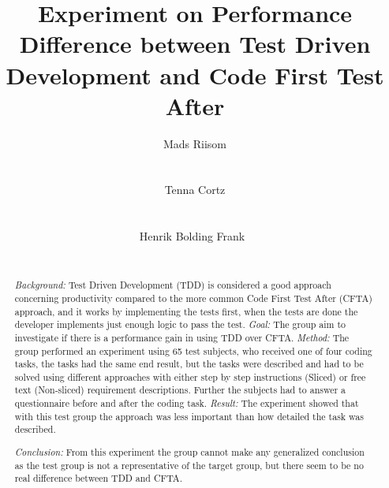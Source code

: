 \documentclass{sig-alternate-05-2015}
\begin{document}
	




\title{Experiment on Performance Difference between Test Driven Development and Code First Test After}

\author{
\alignauthor
	Mads Riisom\\
	\\
	\\
\alignauthor
	Tenna Cortz\\
	\\
	\\
\alignauthor
	Henrik Bolding Frank\
	\\
	\\
}

\maketitle
\begin{abstract}
\textit{Background:} Test Driven Development (TDD) is considered a good approach concerning productivity compared to the more common Code First Test After (CFTA) approach, and it works by implementing the tests first, when the tests are done the developer implements just enough logic to pass the test. \textit{Goal:} The group aim to investigate if there is a performance gain in using TDD over CFTA. \textit{Method:} The group performed an experiment using 65 test subjects, who received one of four coding tasks, the tasks had the same end result, but the tasks were described and had to be solved using different approaches with either step by step instructions (Sliced) or free text (Non-sliced) requirement descriptions. Further the subjects had to answer a questionnaire before and after the coding task. \textit{Result:} The experiment showed that with this test group the approach was less important than how detailed the task was described.

\textit{Conclusion:} From this experiment the group cannot make any generalized conclusion as the test group is not a representative of the target group, but there seem to be no real difference between TDD and CFTA.

\end{abstract}
\end{document}
